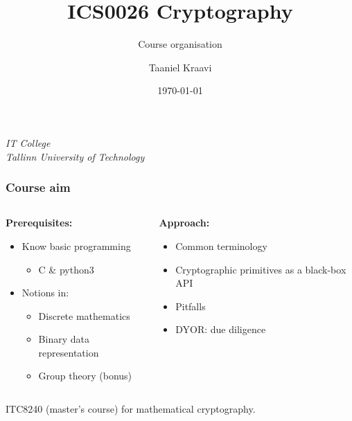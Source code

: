 \title{ICS0026 Cryptography}
\subtitle{Course organisation}
\date{\today}
\author{Taaniel Kraavi}
\institute%
{%
  \textit{IT College}\\
  \textit{Tallinn University of Technology}
}


\begin{frame}
  \titlepage
\end{frame}

\begin{frame}
  \frametitle{Course aim}

  \begin{columns}[T]
    \begin{column}{.5\textwidth}
      \textbf{Prerequisites:}
      \begin{itemize}[<+->]
        \pause
        \item Know basic programming
        \begin{itemize}
          \item C \& python3
        \end{itemize}
        \item Notions in:
        \begin{itemize}
          \item Discrete mathematics
          \item Binary data representation
          \item Group theory (bonus)
        \end{itemize}
      \end{itemize}
    \end{column}

    \pause
    \begin{column}{.4\textwidth}
      \textbf{Approach:}
      \begin{itemize}[<+->]
        \item Common terminology
        \item Cryptographic primitives as a black-box API
        \item Pitfalls
        \item DYOR: due diligence
      \end{itemize}
    \end{column}
  \end{columns}

  \vspace*{2em}

  \pause
  ITC8240 (master's course) for mathematical cryptography.
\end{frame}

